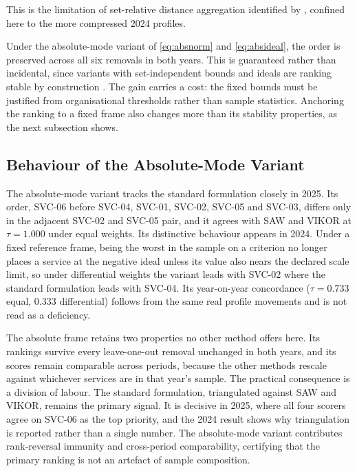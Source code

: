 \documentclass[
  authoryear,
  preprint]{elsarticle}
\begin{document}
This is the limitation of set-relative distance aggregation identified
by \citet{garcia-cascalesRankReversalTOPSIS2012}, confined here to the
more compressed 2024 profiles.

Under the absolute-mode variant of \eqref{eq:absnorm} and
\eqref{eq:absideal}, the order is preserved across all six removals in
both years. This is guaranteed rather than incidental, since variants
with set-independent bounds and ideals are ranking stable by
construction \citep{yangIngeniousSolutionRank2020}. The gain carries a
cost: the fixed bounds must be justified from organisational thresholds
rather than sample statistics. Anchoring the ranking to a fixed frame
also changes more than its stability properties, as the next subsection
shows.

\subsection{Behaviour of the Absolute-Mode
Variant}\label{sec-absolutemode}

The absolute-mode variant tracks the standard formulation closely in
2025. Its order, SVC-06 before SVC-04, SVC-01, SVC-02, SVC-05 and
SVC-03, differs only in the adjacent SVC-02 and SVC-05 pair, and it
agrees with SAW and VIKOR at \(\tau = 1.000\) under equal weights. Its
distinctive behaviour appears in 2024. Under a fixed reference frame,
being the worst in the sample on a criterion no longer places a service
at the negative ideal unless its value also nears the declared scale
limit, so under differential weights the variant leads with SVC-02 where
the standard formulation leads with SVC-04. Its year-on-year concordance
(\(\tau = 0.733\) equal, \(0.333\) differential) follows from the same
real profile movements and is not read as a deficiency.

The absolute frame retains two properties no other method offers here.
Its rankings survive every leave-one-out removal unchanged in both
years, and its scores remain comparable across periods, because the
other methods rescale against whichever services are in that year's
sample. The practical consequence is a division of labour. The standard
formulation, triangulated against SAW and VIKOR, remains the primary
signal. It is decisive in 2025, where all four scorers agree on SVC-06
as the top priority, and the 2024 result shows why triangulation is
reported rather than a single number. The absolute-mode variant
contributes rank-reversal immunity and cross-period comparability,
certifying that the primary ranking is not an artefact of sample
composition.
\end{document}
